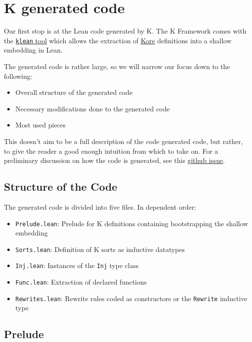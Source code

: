 \chapter{K generated code}\label{chap:gencode}

Our first stop is at the Lean code generated by K. The K Framework comes with
the
\href{https://github.com/runtimeverification/k/tree/master/pyk/src/pyk/klean}{\texttt{klean}
tool} which allows the extraction of
\href{https://kframework.org/docs/user_manual/#k-process-overview}{Kore}
definitions into a shallow embedding in Lean.

The generated code is rather
large, so we will narrow our focus down to the following:

\begin{itemize}
\item Overall structure of the generated code
\item Necessary modifications done to the generated code
\item Most used pieces
\end{itemize}

This doesn't aim to be a full description of the code generated code, but
rather, to give the reader a good enough intuition from which to take on. For a
preliminary discussion on how the code is generated, see this
\href{https://github.com/runtimeverification/k/issues/4552}{github issue}.

\section{Structure of the Code}

The generated code is divided into five files. In dependent order:

\begin{itemize}
\item \texttt{Prelude.lean}: Prelude for K definitions containing bootstrapping
  the shallow embedding
\item \texttt{Sorts.lean}: Definition of K sorts as inductive datatypes
\item \texttt{Inj.lean}: Instances of the \texttt{Inj} type class
\item \texttt{Func.lean}: Extraction of declared functions
\item \texttt{Rewrites.lean}: Rewrite rules coded as constructors or the
  \texttt{Rewrite} inductive type
\end{itemize}

\section{Prelude}

